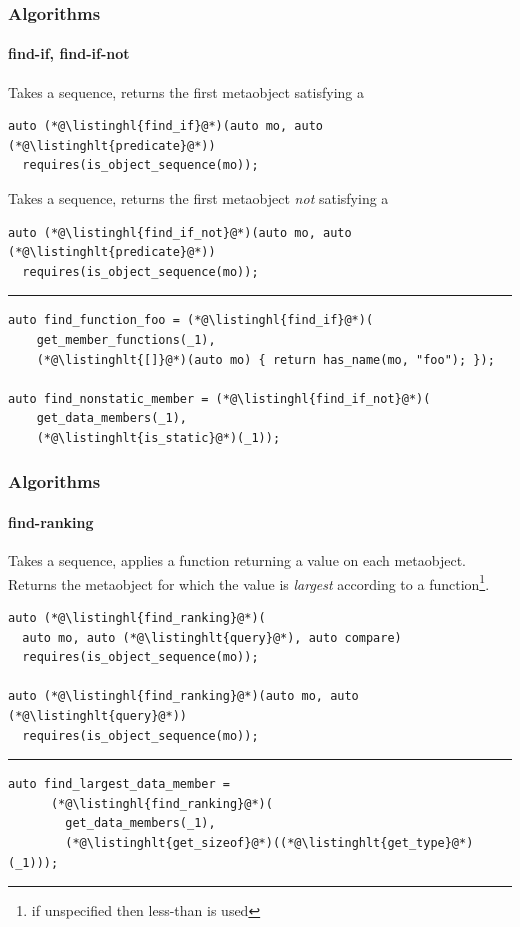 \documentclass[aspectratio=169,compress,table,xcolor=table]{beamer}
\begin{document}
\begin{frame}[fragile]
  \frametitle{Algorithms}
  \framesubtitle{find-if, find-if-not}
  Takes a sequence, returns the first metaobject satisfying
  a 
  \begin{lstlisting}[language=c++2x]
auto (*@\listinghl{find_if}@*)(auto mo, auto (*@\listinghlt{predicate}@*))
  requires(is_object_sequence(mo));
  \end{lstlisting}
  \vfill
  Takes a sequence, returns the first metaobject {\em not} satisfying
  a 
  \begin{lstlisting}[language=c++2x]
auto (*@\listinghl{find_if_not}@*)(auto mo, auto (*@\listinghlt{predicate}@*))
  requires(is_object_sequence(mo));
  \end{lstlisting}
  \hrule
  \vfill
  \begin{lstlisting}[language=c++2x,basicstyle=\small\ttfamily]
auto find_function_foo = (*@\listinghl{find_if}@*)(
    get_member_functions(_1),
    (*@\listinghlt{[]}@*)(auto mo) { return has_name(mo, "foo"); });

auto find_nonstatic_member = (*@\listinghl{find_if_not}@*)(
    get_data_members(_1),
    (*@\listinghlt{is_static}@*)(_1));
  \end{lstlisting}
\end{frame}
\begin{frame}[fragile]
  \frametitle{Algorithms}
  \framesubtitle{find-ranking}
  Takes a sequence, applies a  function returning a value on each metaobject.\\
  Returns the metaobject for which the value is {\em largest} according
  to a  function\footnote{if unspecified then less-than is used}.
  \begin{lstlisting}[language=c++2x]
auto (*@\listinghl{find_ranking}@*)(
  auto mo, auto (*@\listinghlt{query}@*), auto compare)
  requires(is_object_sequence(mo));

auto (*@\listinghl{find_ranking}@*)(auto mo, auto (*@\listinghlt{query}@*))
  requires(is_object_sequence(mo));
  \end{lstlisting}
  \hrule
  \vfill
  \begin{lstlisting}[language=c++2x,basicstyle=\small\ttfamily]
    auto find_largest_data_member =
      (*@\listinghl{find_ranking}@*)(
        get_data_members(_1),
        (*@\listinghlt{get_sizeof}@*)((*@\listinghlt{get_type}@*)(_1)));
  \end{lstlisting}
\end{frame}
\end{document}
